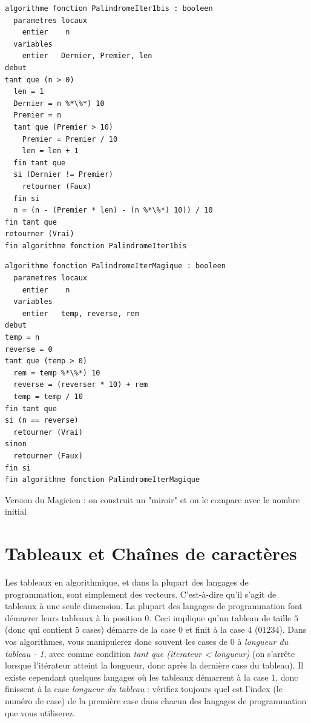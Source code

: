 \documentclass[11pt,a4paper]{article}
\begin{document}
\begin{table}[ht!]
  \centering
\begin{lstlisting}[style=algorithmique]
algorithme fonction PalindromeIter1bis : booleen
  parametres locaux
    entier    n
  variables
    entier   Dernier, Premier, len
debut
tant que (n > 0)
  len = 1
  Dernier = n %*\%*) 10
  Premier = n
  tant que (Premier > 10)
    Premier = Premier / 10
    len = len + 1
  fin tant que
  si (Dernier != Premier)
    retourner (Faux)
  fin si
  n = (n - (Premier * len) - (n %*\%*) 10)) / 10
fin tant que
retourner (Vrai)
fin algorithme fonction PalindromeIter1bis \end{lstlisting}
\end{table}


\begin{table}[ht!]
  \centering
\begin{lstlisting}[style=algorithmique]
algorithme fonction PalindromeIterMagique : booleen
  parametres locaux
    entier    n
  variables
    entier   temp, reverse, rem
debut
temp = n
reverse = 0
tant que (temp > 0)
  rem = temp %*\%*) 10
  reverse = (reverser * 10) + rem
  temp = temp / 10
fin tant que
si (n == reverse)
  retourner (Vrai)
sinon
  retourner (Faux)
fin si
fin algorithme fonction PalindromeIterMagique \end{lstlisting}
  \caption{Version du Magicien : on construit un "miroir" et on le compare avec le nombre initial}
\end{table}

\newpage


\section{Tableaux et Chaînes de caractères}

\bigskip

Les tableaux en algorithmique, et dans la plupart des langages de programmation, sont simplement des vecteurs.
C'est-à-dire qu'il s'agit de tableaux à une seule dimension.
La plupart des langages de programmation font démarrer leurs tableaux à la position $ 0 $.
Ceci implique qu'un tableau de taille $ 5 $ (donc qui contient $ 5 $ cases) démarre de la case $ 0 $ et finit à la case $ 4 $ ($ 0 1 2 3 4 $).
Dans vos algorithmes, vous manipulerez donc souvent les cases de $ 0 $ à \textit{longueur du tableau - 1}, avec comme condition \textit{tant que (iterateur < longueur)} (on s'arrête lorsque l'itérateur atteint la longueur, donc après la dernière case du tableau).
Il existe cependant quelques langages où les tableaux démarrent à la case $ 1 $, donc finissent à la case \textit{longueur du tableau} : vérifiez toujours quel est l'index (le numéro de case) de la première case dans chacun des langages de programmation que vous utiliserez.
\end{document}
